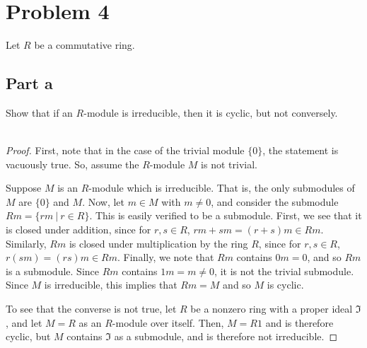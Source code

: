 \documentclass[12pt,reqno]{amsart}
\begin{document}
\newpage
\section*{Problem 4}
Let $R$ be a commutative ring.
\subsection*{Part a}
Show that if an $R$-module is irreducible, then it is cyclic, but not
conversely.
\\
\\
\begin{proof}
    First, note that in the case of the trivial module $\{0\}$, the statement is
    vacuously true. So, assume the $R$-module $M$ is not trivial.

    Suppose $M$ is an $R$-module which is irreducible. That is, the only
    submodules of $M$ are $\{0\}$ and $M$. Now, let $m\in M$ with $m\neq 0$, and
    consider the submodule $Rm = \{rm\ |\ r\in R\}$. This is easily verified to
    be a submodule. First, we see that it is closed under addition, since for
    $r,s\in R$, $rm+sm = (r+s)m\in Rm$. Similarly, $Rm$ is closed under
    multiplication by the ring $R$, since for $r,s\in R$, $r(sm) = (rs)m\in Rm$.
    Finally, we note that $Rm$ contains $0m = 0$, and so $Rm$ is a submodule.
    Since $Rm$ contains $1m=m\neq 0$, it is not the trivial submodule. Since
    $M$ is irreducible, this implies that $Rm=M$ and so $M$ is cyclic.

    To see that the converse is not true, let $R$ be a nonzero ring with a
    proper ideal $\mathfrak{I}$, and let $M = R$ as an $R$-module over itself.
    Then, $M = R1$ and is therefore cyclic, but $M$ contains $\mathfrak{I}$ as a
    submodule, and is therefore not irreducible.
\end{proof}
\end{document}
